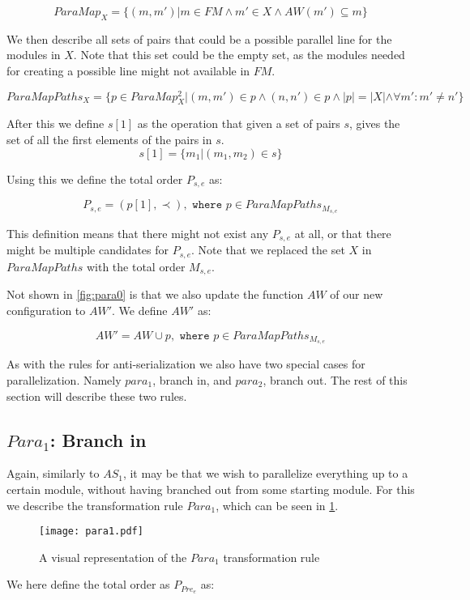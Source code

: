 \[ParaMap_{X} = \{(m, m')| m \in FM \land m' \in X \land AW(m') \subseteq m\} \]

We then describe all sets of pairs that could be a possible parallel line for the modules in $X$. Note that this set could be the empty set, as the modules needed for creating a possible line might not available in $FM$.

\[ParaMapPaths_{X} = \{p \in ParaMap_{X}^2 | (m,m') \in p \land (n,n') \in p \land |p| = |X| \land  \forall m': m' \neq n' \}\]

After this we define $s[1]$ as the operation that given a set of pairs $s$, gives the set of all the first elements of the pairs in $s$.
\[s[1] = \{m_1 | (m_1, m_2) \in s\}\]

Using this we define the total order $P_{s,e}$ as:

\[ P_{s,e} = (p[1], \prec), \texttt{ where } p \in ParaMapPaths_{M_{s,e}} \]

This definition means that there might not exist any $P_{s,e}$ at all, or that there might be multiple candidates for $P_{s,e}$. Note that we replaced the set $X$ in $ParaMapPaths$ with the total order $M_{s,e}$.

Not shown in \cref{fig:para0} is that we also update the function $AW$ of our new configuration to $AW'$. We define $AW'$ as:

\[AW' = AW \cup p, \texttt{ where } p \in ParaMapPaths_
{M_{s,e}}\]

As with the rules for anti-serialization we also have two special cases for parallelization. Namely $para_1$, branch in, and $para_2$, branch out. The rest of this section will describe these two rules.

\subsection{$Para_1$: Branch in}
Again, similarly to $AS_1$, it may be that we wish to parallelize everything up to a certain module, without having branched out from some starting module. For this we describe the transformation rule $Para_1$, which can be seen in \cref{fig:para1}.

\begin{figure}[H]
	\centering
	\texttt{[image: para1.pdf]}
	\caption{A visual representation of the $Para_1$ transformation rule}
	\label{fig:para1}
\end{figure}

We here define the total order as $P_{Pre_e}$ as:

